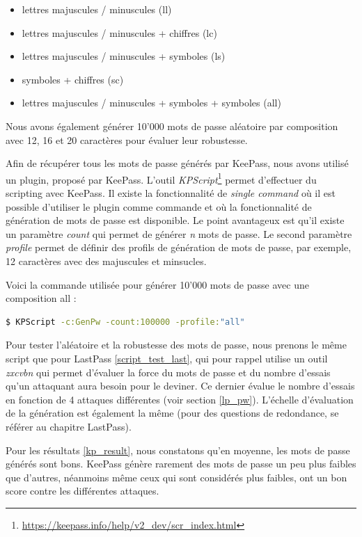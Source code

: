 \begin{itemize}
	\item lettres majuscules / minuscules (ll)
	\item lettres majuscules / minuscules + chiffres (lc)
	\item lettres majuscules / minuscules + symboles (ls)
	\item symboles + chiffres (sc)
	\item lettres majuscules / minuscules + symboles + symboles (all)
\end{itemize}

Nous avons également générer 10'000 mots de passe aléatoire par composition avec 12, 16 et 20 caractères pour évaluer leur robustesse. 

Afin de récupérer tous les mots de passe générés par KeePass, nous avons utilisé un plugin, proposé par KeePass. L'outil \textit{KPScript}\footnote{\href{https://keepass.info/help/v2\_dev/scr\_index.html}{https://keepass.info/help/v2\_dev/scr\_index.html}} permet d'effectuer du scripting avec KeePass. Il existe la fonctionnalité de \textit{single command} où il est possible d'utiliser le plugin comme commande et où la fonctionnalité de génération de mots de passe est disponible. Le point avantageux est qu'il existe un paramètre \textit{count} qui permet de générer \textit{n} mots de passe. Le second paramètre \textit{profile} permet de définir des profils de génération de mots de passe, par exemple, 12 caractères avec des majuscules et minsucles. 

Voici la commande utilisée pour générer 10'000 mots de passe avec une composition all : 
\begin{lstlisting}[language=bash,caption=Génération de mots de passe sur KeePass]
$ KPScript -c:GenPw -count:100000 -profile:"all"
\end{lstlisting}

Pour tester l'aléatoire et la robustesse des mots de passe, nous prenons le même script que pour LastPass \ref{script_test_last}, qui pour rappel utilise un outil \textit{zxcvbn} qui permet d'évaluer la force du mots de passe et du nombre d'essais qu'un attaquant aura besoin pour le deviner. Ce dernier évalue le nombre d'essais en fonction de 4 attaques différentes (voir section \ref{lp_pw}). L'échelle d'évaluation de la génération est également la même (pour des questions de redondance, se référer au chapitre LastPass).

Pour les résultats \ref{kp_result}, nous constatons qu'en moyenne, les mots de passe générés sont bons. KeePass génère rarement des mots de passe un peu plus faibles que d'autres, néanmoins même ceux qui sont considérés plus faibles, ont un bon score contre les différentes attaques. 

